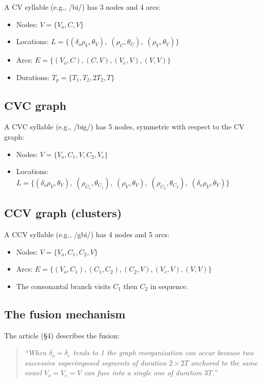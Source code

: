 \documentclass[11pt,a4paper]{article}
\begin{document}
A CV syllable (e.g., /bi/) has 3 nodes and 4 arcs:
\begin{itemize}
\item Nodes: $V = \{V_o, C, V\}$
\item Locations: $L = \{(\delta_o \rho_V, \theta_V),\;
  (\rho_C, \theta_C),\;(\rho_V, \theta_V)\}$
\item Arcs: $E = \{(V_o, C), (C, V), (V_e, V), (V, V)\}$
\item Durations: $T_p = \{T_1, T_2, 2T_2, T\}$
\end{itemize}

\subsection{CVC graph}

A CVC syllable (e.g., /big/) has 5 nodes, symmetric with respect to
the CV graph:
\begin{itemize}
\item Nodes: $V = \{V_o, C_1, V, C_2, V_e\}$
\item Locations: $L = \{(\delta_o \rho_V, \theta_V),\;
  (\rho_{C_1}, \theta_{C_1}),\;(\rho_V, \theta_V),\;
  (\rho_{C_2}, \theta_{C_2}),\;(\delta_e \rho_V, \theta_V)\}$
\end{itemize}

\subsection{CCV graph (clusters)}

A CCV syllable (e.g., /gbi/) has 4 nodes and 5 arcs:
\begin{itemize}
\item Nodes: $V = \{V_o, C_1, C_2, V\}$
\item Arcs: $E = \{(V_o, C_1), (C_1, C_2), (C_2, V), (V_e, V), (V, V)\}$
\item The consonantal branch visits $C_1$ then $C_2$ in sequence.
\end{itemize}

\subsection{The fusion mechanism}

The article (\S4) describes the fusion:
\begin{quote}
\itshape
``When $\delta_o = \delta_e$ tends to 1 the graph reorganization
can occur because two successive superimposed segments of duration
$2 \times 2T$ anchored to the same vowel $V_o = V_e = V$ can fuse
into a single one of duration $3T$.''
\end{quote}
\end{document}
